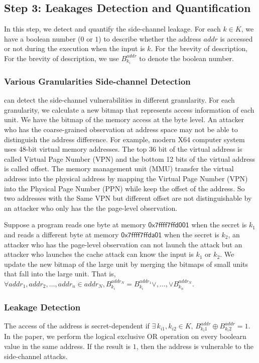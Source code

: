 \subsection{Step 3: Leakages Detection and Quantification}
In this step, we detect and quantify the side-channel leakage. For each $k \in K$, we have a boolean number ($0$ or $1$) to describe whether the address $addr$ is accessed or not during the execution when the input is $k$. For the brevity of description, For the brevity of description, we use $B^{addr}_{k_i}$ to denote the boolean number.



\subsubsection{Various Granularities Side-channel Detection}
\ctool{} can detect the side-channel vulnerabilities in different granularity. For each granularity, we calculate a new bitmap that represents access information of each unit. We have the bitmap of the memory access at the byte level. An attacker who has the coarse-grained observation at address space may not be able to distinguish the address difference. For example, modern X64 computer system uses 48-bit virtual memory addresses. The top 36 bit of the virtual address is called Virtual Page Number (VPN) and the bottom 12 bits of the virtual address is called offset. The memory management unit (MMU) transfer the virtual address into the physical address by mapping the Virtual Page Number (VPN) into the Physical Page Number (PPN) while keep the offset of the address. So two addresses with the Same VPN but different offset are not distinguishable by an attacker who only has the the page-level observation.

Suppose a program reads one byte at memory $\mathsf{0x7ffff7ffd001}$ when the secret is $k_1$ and reads a different byte at memory $\mathsf{0x7ffff7ffda01}$ when the secret is $k_2$, an attacker who has the page-level observation can not launch the attack but an attacker who launches the cache attack can know the input is $k_1$ or $k_2$. We update the new bitmap of the large unit by merging the bitmaps of small units that fall into the large unit. That is, $\forall addr_1, addr_2, \dots, addr_n \in addr_N, B^{addr_N}_{k_i} = B^{addr_1}_{k_i} \lor,\dots,\lor B^{addr_N}_{k_n}$.


\subsubsection{Leakage Detection} The access of the address is secret-dependent if $ \exists\, k_{i1}, k_{i2} \in K, \, B^{addr}_{k_i1} \oplus  B^{addr}_{k_i2} =1 $. In the paper, we perform the logical exclusive OR operation on every boolearn value in the same address. If the result is $1$, then the address is vulnerable to the side-channel attacks.

